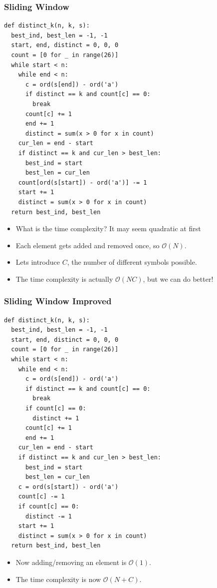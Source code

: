 \documentclass{beamer}
\begin{document}
\begin{frame}
    \frametitle{Sliding Window}
	\begin{tiny}
        \begin{verbatim}
def distinct_k(n, k, s):
  best_ind, best_len = -1, -1
  start, end, distinct = 0, 0, 0
  count = [0 for _ in range(26)]
  while start < n:
    while end < n:
      c = ord(s[end]) - ord('a')
      if distinct == k and count[c] == 0:
        break
      count[c] += 1
      end += 1
      distinct = sum(x > 0 for x in count)
    cur_len = end - start
    if distinct == k and cur_len > best_len:
      best_ind = start
      best_len = cur_len
    count[ord(s[start]) - ord('a')] -= 1
    start += 1
    distinct = sum(x > 0 for x in count)
  return best_ind, best_len
        \end{verbatim}
    \end{tiny}
    \vspace*{-0.3cm}
    \begin{itemize}
        \item<1-> What is the time complexity?  { It may seem quadratic at first}
        \item<3-> Each element gets added and removed once, so $\mathcal{O}(N)$.
        \item<4-> Lets introduce $C$, the number of different symbols possible.
        \item<4-> The time complexity is actually $\mathcal{O}(NC)$, but we can do better!
    \end{itemize}
\end{frame}


\begin{frame}
    \frametitle{Sliding Window Improved}
	\begin{tiny}
        \begin{verbatim}
def distinct_k(n, k, s):
  best_ind, best_len = -1, -1
  start, end, distinct = 0, 0, 0
  count = [0 for _ in range(26)]
  while start < n:
    while end < n:
      c = ord(s[end]) - ord('a')
      if distinct == k and count[c] == 0:
        break
      if count[c] == 0:
        distinct += 1
      count[c] += 1
      end += 1
    cur_len = end - start
    if distinct == k and cur_len > best_len:
      best_ind = start
      best_len = cur_len
    c = ord(s[start]) - ord('a')
    count[c] -= 1
    if count[c] == 0:
      distinct -= 1
    start += 1
    distinct = sum(x > 0 for x in count)
  return best_ind, best_len
        \end{verbatim}
    \end{tiny}
    \begin{itemize}
        \item<2-> Now adding/removing an element is $\mathcal{O}(1)$.
        \item<2-> The time complexity is now $\mathcal{O}(N + C)$.
    \end{itemize}
\end{frame}
\end{document}
